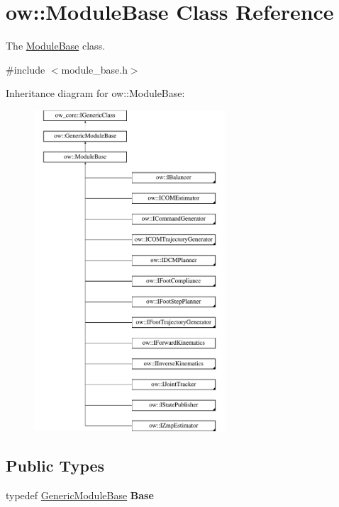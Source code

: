 \hypertarget{classow_1_1ModuleBase}{}\section{ow\+:\+:Module\+Base Class Reference}
\label{classow_1_1ModuleBase}


The \hyperlink{classow_1_1ModuleBase}{Module\+Base} class.  




{\ttfamily \#include $<$module\+\_\+base.\+h$>$}

Inheritance diagram for ow\+:\+:Module\+Base\+:\begin{figure}[H]
\begin{center}
\leavevmode
\includegraphics[height=12.000000cm]{df/d9f/classow_1_1ModuleBase}
\end{center}
\end{figure}
\subsection*{Public Types}
\begin{DoxyCompactItemize}
\item 
typedef \hyperlink{classow_1_1GenericModuleBase}{Generic\+Module\+Base} {\bfseries Base}\hypertarget{classow_1_1ModuleBase_a2bac647b5018d6b8a046d03aa42a9676}{}\label{classow_1_1ModuleBase_a2bac647b5018d6b8a046d03aa42a9676}

\end{DoxyCompactItemize}
